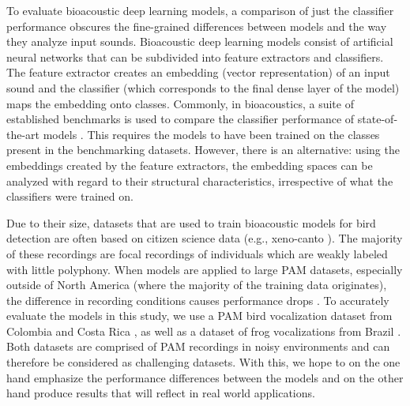 To evaluate bioacoustic deep learning models, a comparison of just the classifier performance obscures the fine-grained differences between models and the way they analyze input sounds.
Bioacoustic deep learning models consist of artificial neural networks that can be subdivided into feature extractors and classifiers. 
The feature extractor creates an embedding (vector representation) of an input sound and the classifier (which corresponds to the final dense layer of the model) maps the embedding onto classes.
Commonly, in bioacoustics, a suite of established benchmarks is used to compare the classifier performance of state-of-the-art models \cite{hamer_birb_2023}.
This requires the models to have been trained on the classes present in the benchmarking datasets.
However, there is an alternative: using the embeddings created by the feature extractors, the embedding spaces can be analyzed with regard to their structural characteristics, irrespective of what the classifiers were trained on.


Due to their size, datasets that are used to train bioacoustic models for bird detection are often based on citizen science data (e.g., xeno-canto \cite{xeno-canto_xeno-canto_2025}).
The majority of these recordings are focal recordings of individuals which are weakly labeled with little polyphony.
When models are applied to large PAM datasets, especially outside of North America (where the majority of the training data originates), the difference in recording conditions causes performance drops \cite{perez-granados_birdnet_2023}.
To accurately evaluate the models in this study, we use a PAM bird vocalization dataset from Colombia and Costa Rica \cite{vega-hidalgo_collection_2023}, as well as a dataset of frog vocalizations from Brazil \cite{canas_dataset_2023}.
Both datasets are comprised of PAM recordings in noisy environments and can therefore be considered as challenging datasets.
With this, we hope to on the one hand emphasize the performance differences between the models and on the other hand produce results that will reflect in real world applications.

